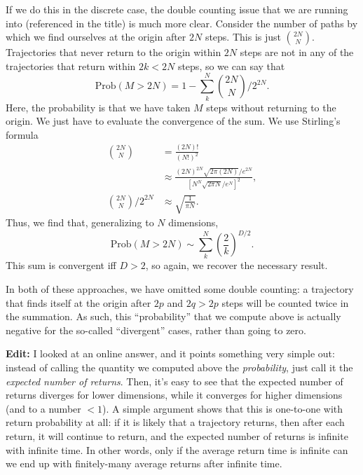 \documentclass[12pt]{report}
\newcommand*{\p}[1]{\left(#1\right)}
\newcommand*{\s}[1]{\left[#1\right]}
\begin{document}
If we do this in the discrete case, the double counting issue that we are
running into (referenced in the title) is much more clear. Consider the
number of paths by which we find ourselves at the origin after $2N$ steps. This
is just $\binom{2N}{N}$. Trajectories that never return to the origin within
$2N$ steps are not in any of the trajectories that return within $2k < 2N$
steps, so we can say that
\begin{equation}
    \mathrm{Prob}\p{M > 2N}
        = 1 - \sum\limits_k^N \binom{2N}{N} / 2^{2N}.
\end{equation}
Here, the probability is that we have taken $M$ steps without returning to the
origin. We just have to evaluate the convergence of the sum. We use Stirling's
formula
\begin{align}
    \binom{2N}{N} &= \frac{\p{2N}! }{ \p{N!}^2} \nonumber\\
        &\approx \frac{(2N)^{2N} \sqrt{2\pi (2N)}/ e^{2N}}{
            \s{N^N \sqrt{2\pi N} / e^N}^2},\\
    \binom{2N}{N} / 2^{2N} &\approx
        \sqrt{\frac{1}{\pi N}}.
\end{align}
Thus, we find that, generalizing to $N$ dimensions,
\begin{equation}
    \mathrm{Prob}\p{M > 2N} \sim \sum\limits_k^N \p{\frac{2}{k}}^{D / 2}.
\end{equation}
This sum is convergent iff $D > 2$, so again, we recover the necessary result.

In both of these approaches, we have omitted some double counting: a trajectory
that finds itself at the origin after $2p$ and $2q > 2p$ steps will be counted
twice in the summation. As such, this ``probability'' that we compute above is
actually negative for the so-called ``divergent'' cases, rather than going to
zero.

\textbf{Edit:} I looked at an online answer, and it points something very simple
out: instead of calling the quantity we computed above the \emph{probability},
just call it the \emph{expected number of returns}. Then, it's easy to see that
the expected number of returns diverges for lower dimensions, while it converges
for higher dimensions (and to a number $< 1$). A simple argument shows that this
is one-to-one with return probability at all: if it is likely that a trajectory
returns, then after each return, it will continue to return, and the expected
number of returns is infinite with infinite time. In other words, only if the
average return time is infinite can we end up with finitely-many average returns
after infinite time.
\end{document}

